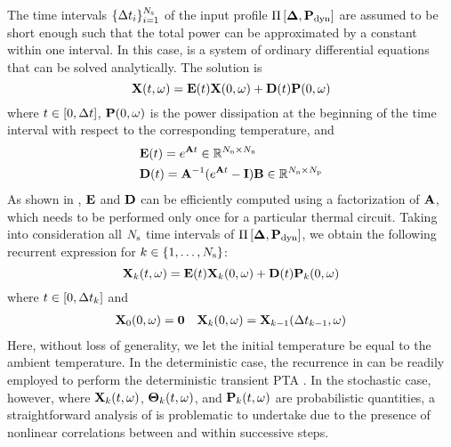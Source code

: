 The time intervals $\{ \Delta t_i \}_{i = 1}^{N_\text{s}}$ of the input profile $\prof{\mP_\dyn}$ are assumed to be short enough such that the total power can be approximated by a constant within one interval. In this case,  is a system of ordinary differential equations that can be solved analytically. The solution is
\begin{equation} \elabel{ode-solution}
  \vX(\t, \o) = \mE(\t) \vX(0, \o) + \mD(\t) \vP(0, \o)
\end{equation}
where $t \in [0, \Delta t]$, $\mathbf{P}(0, \omega)$ is the power dissipation at the beginning of the time interval with respect to the corresponding temperature, and
\begin{align*}
  & \mE(\t) = e^{\mA \t} \in \real^{\nodes \times \nodes} \\
  & \mD(\t) = \mA^{-1} (e^{\mA \t} - \mI) \mB \in \real^{\nodes \times \cores}
\end{align*}
As shown in \cite{ukhov2012}, $\mE$ and $\mD$ can be efficiently computed using a factorization of $\mA$, which needs to be performed only once for a particular thermal circuit. Taking into consideration all $N_\text{s}$ time intervals of $\prof{\mP_\dyn}$, we obtain the following recurrent expression for $k \in \{ 1, \dotsc, N_\text{s} \}$:
\begin{equation} \elabel{recurrence}
  \vX_k(\t, \o) = \mE(\t) \vX_k(0, \o) + \mD(\t) \vP_k(0, \o)
\end{equation}
where $t \in [ 0, \Delta t_k ]$ and
\begin{align*}
  & \mathbf{X}_0(0, \omega) = \mathbf{0} & \mathbf{X}_k(0, \omega) = \mathbf{X}_{k - 1}(\Delta t_{k - 1}, \omega)
\end{align*}
Here, without loss of generality, we let the initial temperature be equal to the ambient temperature. In the deterministic case, the recurrence in  can be readily employed to perform the deterministic transient PTA \cite{ukhov2012}. In the stochastic case, however, where $\mathbf{X}_k(t, \omega)$, ${\boldsymbol\Theta}_k(t, \omega)$, and $\mathbf{P}_k(t, \omega)$ are probabilistic quantities, a straightforward analysis of  is problematic to undertake due to the presence of nonlinear correlations between and within successive steps.
